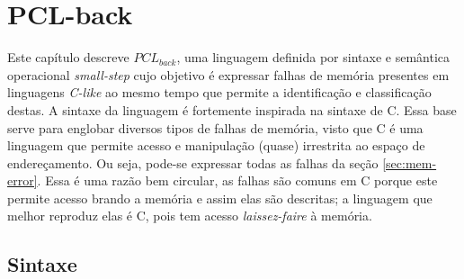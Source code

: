 \chapter{PCL-back}
\label{chap3}


Este capítulo descreve $PCL_{back}$, uma linguagem definida por sintaxe e semântica operacional \emph{small-step} cujo objetivo é expressar falhas de memória presentes em linguagens \emph{C-like} ao mesmo tempo que permite a identificação e classificação destas. A sintaxe da linguagem é fortemente inspirada na sintaxe de C. Essa base serve para englobar diversos tipos de falhas de memória, visto que C é uma linguagem que permite acesso e manipulação (quase) irrestrita ao espaço de endereçamento. Ou seja, pode-se expressar todas as falhas da seção \ref{sec:mem-error}. Essa é uma razão bem circular, as falhas são comuns em C porque este permite acesso brando a memória e assim elas são descritas; a linguagem que melhor reproduz elas é C, pois tem acesso \emph{laissez-faire} à memória.


\section{Sintaxe}

